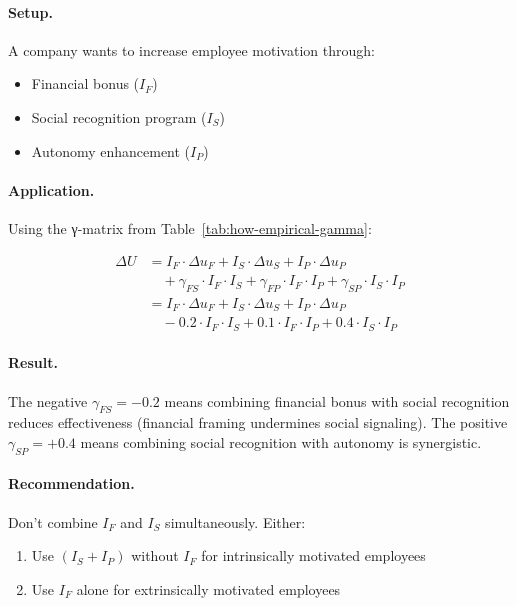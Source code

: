 \paragraph{Setup.}
A company wants to increase employee motivation through:
\begin{itemize}
\item Financial bonus ($I_F$)
\item Social recognition program ($I_S$)
\item Autonomy enhancement ($I_P$)
\end{itemize}

\paragraph{Application.}
Using the γ-matrix from Table~\ref{tab:how-empirical-gamma}:

\begin{align}
\Delta U &= I_F \cdot \Delta u_F + I_S \cdot \Delta u_S + I_P \cdot \Delta u_P \\
&\quad + \gamma_{FS} \cdot I_F \cdot I_S + \gamma_{FP} \cdot I_F \cdot I_P + \gamma_{SP} \cdot I_S \cdot I_P \\
&= I_F \cdot \Delta u_F + I_S \cdot \Delta u_S + I_P \cdot \Delta u_P \\
&\quad - 0.2 \cdot I_F \cdot I_S + 0.1 \cdot I_F \cdot I_P + 0.4 \cdot I_S \cdot I_P
\end{align}

\paragraph{Result.}
The negative $\gamma_{FS} = -0.2$ means combining financial bonus with social recognition
reduces effectiveness (financial framing undermines social signaling).
The positive $\gamma_{SP} = +0.4$ means combining social recognition with autonomy is synergistic.

\paragraph{Recommendation.}
Don't combine $I_F$ and $I_S$ simultaneously. Either:
\begin{enumerate}
\item Use $(I_S + I_P)$ without $I_F$ for intrinsically motivated employees
\item Use $I_F$ alone for extrinsically motivated employees
\end{enumerate}


